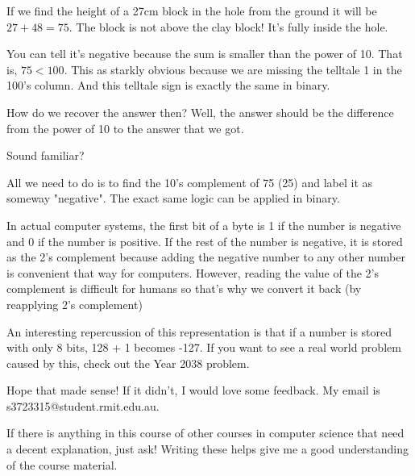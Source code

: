 \documentclass{article}
\begin{document}
  If we find the height of a 27cm block in the hole from the ground it will be $27 + 48 = 75$. The block is not above the clay block!
  It's fully inside the hole.

  You can tell it's negative because the sum is smaller than the power of 10. That is, $75 < 100$. This as starkly obvious because we
  are missing the telltale 1 in the 100's column. And this telltale sign is exactly the same in binary.

  How do we recover the answer then? Well, the answer should be the difference from the power of 10 to the answer that we got.

  Sound familiar?

  All we need to do is to find the 10's complement of 75 (25) and label it as someway "negative". The exact same logic can be applied in binary.
  
  In actual computer systems, the first bit of a byte is 1 if the number is negative and 0 if the number is positive. If the rest of the number
  is negative, it is stored as the 2's complement because adding the negative number to any other number is convenient that way for computers.
  However, reading the value of the 2's complement is difficult for humans so that's why we convert it back (by reapplying 2's complement)

  An interesting repercussion of this representation is that if a number is stored with only 8 bits, 128 + 1 becomes -127. If you
  want to see a real world problem caused by this, check out the Year 2038 problem.

  Hope that made sense! If it didn't, I would love some feedback. My email is s3723315@student.rmit.edu.au.
  
  If there is anything in this course of other courses in computer science that need a decent explanation, just ask! Writing these
  helps give me a good understanding of the course material.
\end{document}
